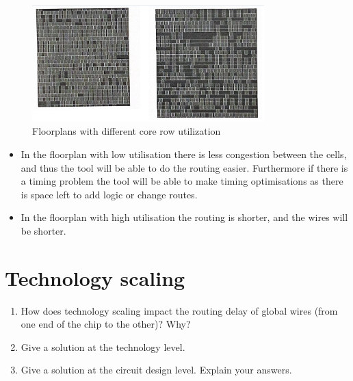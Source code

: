 \documentclass[fr]{sourcefiles/eplexam} %
\begin{document}
\begin{figure}[h]
    \centering
    \includegraphics[width=0.8\textwidth]{FloorplansQ7.png}
    \caption{Floorplans with different core row utilization}
    \label{floorplans}
\end{figure}


\begin{solution}
\begin{itemize}
    \item In the floorplan with low utilisation there is less congestion between the cells, and thus the tool will be able to do the routing easier. Furthermore if there is a timing problem the tool will be able to make timing optimisations as there is space left to add logic or change routes.
     \item In the floorplan with high utilisation the routing is shorter, and the wires will be shorter.
\end{itemize}






\end{solution}


\section{Technology scaling}
\begin{enumerate}
    \item How does technology scaling impact the routing delay of global wires (from one end of the chip to the other)? Why?
    \item Give a solution at the technology level. 
    \item Give a solution at the circuit design level. Explain your answers.
\end{enumerate}
\nosolution
\end{document}
